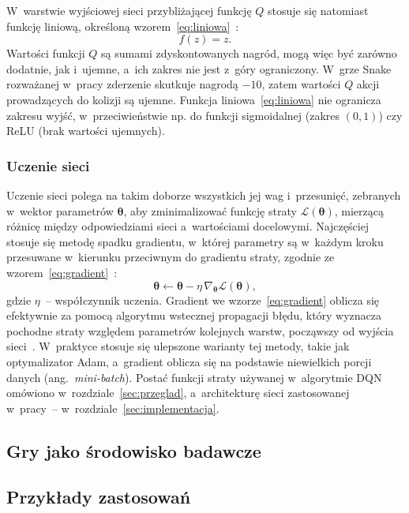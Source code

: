 W~warstwie wyjściowej sieci przybliżającej funkcję $Q$ stosuje się natomiast funkcję liniową, określoną wzorem~\eqref{eq:liniowa}~\cite{mnih2015}:
\begin{equation}
	f(z) = z.
	\label{eq:liniowa}
\end{equation}
Wartości funkcji $Q$ są sumami zdyskontowanych nagród, mogą więc być zarówno dodatnie, jak i~ujemne, a~ich zakres nie jest z~góry ograniczony. W~grze Snake rozważanej w~pracy zderzenie skutkuje nagrodą $-10$, zatem wartości $Q$ akcji prowadzących do kolizji są ujemne. Funkcja liniowa~\eqref{eq:liniowa} nie ogranicza zakresu wyjść, w~przeciwieństwie np. do funkcji sigmoidalnej (zakres $(0, 1)$) czy ReLU (brak wartości ujemnych).
 
\subsubsection{Uczenie sieci}
 
Uczenie sieci polega na takim doborze wszystkich jej wag i~przesunięć, zebranych w~wektor parametrów $\bm{\theta}$, aby zminimalizować funkcję straty $\mathcal{L}(\bm{\theta})$, mierzącą różnicę między odpowiedziami sieci a~wartościami docelowymi. Najczęściej stosuje się metodę spadku gradientu, w~której parametry są w~każdym kroku przesuwane w~kierunku przeciwnym do gradientu straty, zgodnie ze wzorem~\eqref{eq:gradient}~\cite{goodfellow2016}:
\begin{equation}
	\bm{\theta} \leftarrow \bm{\theta} - \eta \, \nabla_{\bm{\theta}} \mathcal{L}(\bm{\theta}),
	\label{eq:gradient}
\end{equation}
gdzie $\eta$~-- współczynnik uczenia. Gradient we wzorze~\eqref{eq:gradient} oblicza się efektywnie za pomocą algorytmu wstecznej propagacji błędu, który wyznacza pochodne straty względem parametrów kolejnych warstw, począwszy od wyjścia sieci~\cite{goodfellow2016}. W~praktyce stosuje się ulepszone warianty tej metody, takie jak optymalizator Adam, a~gradient oblicza się na podstawie niewielkich porcji danych (ang.~\emph{mini-batch}). Postać funkcji straty używanej w~algorytmie DQN omówiono w~rozdziale~\ref{sec:przeglad}, a~architekturę sieci zastosowanej w~pracy~-- w~rozdziale~\ref{sec:implementacja}.

\fi

\subsection{Gry jako środowisko badawcze}
\subsection{Przykłady zastosowań}